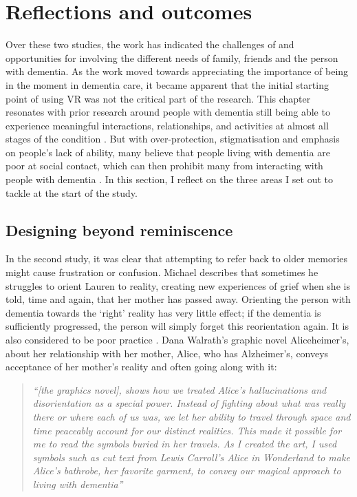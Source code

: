 \section{Reflections and outcomes}
\label{S2:Reflection}
Over these two studies, the work has indicated the challenges of and opportunities for involving the different needs of family, friends and the person with dementia. As the work moved towards appreciating the importance of being in the moment in dementia care, it became apparent that the initial starting point of using VR was not the critical part of the research. This chapter resonates with prior research around people with dementia still being able to experience meaningful interactions, relationships, and activities at almost all stages of the condition \citep{kitwood1997dementia}. But with over-protection, stigmatisation and emphasis on people’s lack of ability, many believe that people living with dementia are poor at social contact, which can then prohibit many from interacting with people with dementia \citep{christine_bryden_dancing_2005, riley_anxiety_2014}. In this section, I reflect on the three areas I set out to tackle at the start of the study.

\subsection{Designing beyond reminiscence}
\label{beyond-reminiscence}
In the second study, it was clear that attempting to refer back to older memories might cause frustration or confusion. Michael describes that sometimes he struggles to orient Lauren to reality, creating new experiences of grief when she is told, time and again, that her mother has passed away. Orienting the person with dementia towards the `right' reality has very little effect; if the dementia is sufficiently progressed, the person will simply forget this reorientation again. It is also considered to be poor practice \citep{cipriani_understanding_2014}. Dana Walrath's graphic novel Aliceheimer's, about her relationship with her mother, Alice, who has Alzheimer's, conveys acceptance of her mother's reality and often going along with it:

\begin{quote}
\textit{``[the graphics novel], shows how we treated Alice's hallucinations and disorientation as a special power. Instead of fighting about what was really there or where each of us was, we let her ability to travel through space and time peaceably account for our distinct realities. This made it possible for me to read the symbols buried in her travels. As I created the art, I used symbols such as cut text from Lewis Carroll's Alice in Wonderland to make Alice's bathrobe, her favorite garment, to convey our magical approach to living with dementia''}\citep{walrath2021aliceheimer,walrath2017end}
\end{quote}

